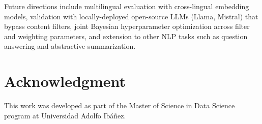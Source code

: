\documentclass[conference]{IEEEtran}
\begin{document}
Future directions include multilingual evaluation with cross-lingual embedding models, validation with locally-deployed open-source LLMs (Llama, Mistral) that bypass content filters, joint Bayesian hyperparameter optimization across filter and weighting parameters, and extension to other NLP tasks such as question answering and abstractive summarization.

\section*{Acknowledgment}

This work was developed as part of the Master of Science in Data Science program at Universidad Adolfo Ib\'{a}\~{n}ez.



\end{document}
